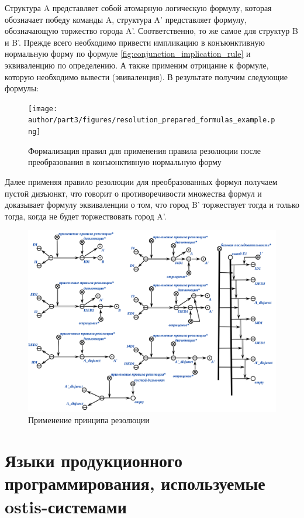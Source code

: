 Структура A представляет собой атомарную логическую формулу, которая обозначает победу команды A, структура A' представляет формулу, обозначающую торжество города A'. Соответственно, то же самое для структур B и B'.
Прежде всего необходимо привести импликацию в конъюнктивную нормальную форму по формуле \ref{fig:conjunction_implication_rule} и эквиваленцию по определению. А также применим отрицание к формуле, которую необходимо вывести (эвиваленция). В результате получим следующие формулы:

\begin{figure}[H]
	\texttt{[image: author/part3/figures/resolution\_prepared\_formulas\_example.png]}
	\caption{Формализация правил для применения правила резолюции после преобразования в конъюнктивную нормальную форму}
	\label{fig:resolution_formulas}
\end{figure}

Далее применяя правило резолюции для преобразованных формул получаем пустой дизъюнкт, что говорит о противоречивости множества формул и доказывает формулу эквиваленции о том, что город B' торжествует тогда и только тогда, когда не будет торжествовать город A'.

\begin{figure}[H]
	\includegraphics[scale=0.7]{author/part3/figures/resolution_inference.png}
	\caption{Применение принципа резолюции}
	\label{fig:resolution_inference}
\end{figure}


\section{Языки продукционного программирования, используемые ostis-системами}
